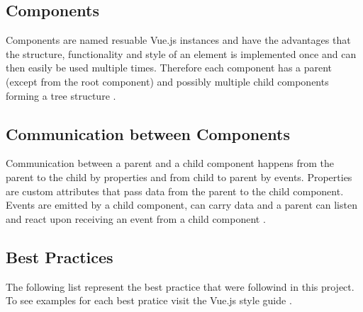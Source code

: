 \subsection{Components}
Components are named resuable Vue.js instances and have the advantages that the structure, functionality and style of an element is implemented once and can then easily be used multiple times. Therefore each component has a parent (except from the root component) and possibly multiple child components forming a tree structure \cite{Vue}. 

\subsection{Communication between Components}
Communication between a parent and a child component happens from the parent to the child by properties and from child to parent by events. Properties are custom attributes that pass data from the parent to the child component. Events are emitted by a child component, can carry data and a parent can listen and react upon receiving an event from a child component \cite{Vue}.

\subsection{Best Practices}
The following list represent the best practice that were followind in this project. To see examples for each best pratice visit the Vue.js style guide  \cite{VueStyleGuide}.

